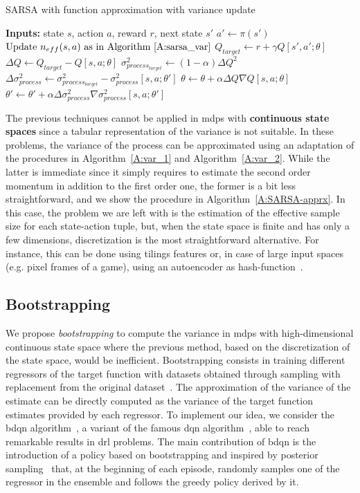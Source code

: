 \begin{algorithm}[t]
\caption{SARSA with function approximation with variance update}
\begin{algorithmic}[1]\label{A:SARSA-apprx}
  \STATE \textbf{Inputs:} state $s$, action $a$, reward $r$, next state $s'$
  \STATE $a' \gets \pi(s')$
  \STATE $\text{Update } n_{eff}(s,a) \text{ as in Algorithm~\ref{A:sarsa_var}}$
  \STATE $Q_{target} \gets r + \gamma Q[s',a'; \theta]$
  \STATE $\Delta Q \gets Q_{target} - Q[s,a; \theta]$
  \STATE $\sigma^2_{process_{target}} \gets (1 - \alpha)\Delta Q^2$
  \STATE $\Delta \sigma^2_{process} \gets \sigma^2_{process_{target}} - \sigma^2_{process}[s,a; \theta']$
  \STATE $\theta \gets \theta + \alpha \Delta Q \nabla Q[s,a; \theta]$
  \STATE $\theta' \gets \theta' + \alpha \Delta \sigma^2_{process} \nabla \sigma^2_{process}[s,a; \theta']$
\end{algorithmic}
\end{algorithm}
The previous techniques cannot be applied in \glspl{mdp} with \textbf{continuous state spaces} since a tabular representation of the variance is not suitable. In these problems, the variance of the process can be approximated using an adaptation of the procedures in Algorithm~\ref{A:var_1} and Algorithm~\ref{A:var_2}. While the latter is immediate since it simply requires to estimate the second order momentum in addition to the first order one, the former is a bit less straightforward, and we show the procedure in Algorithm~\ref{A:SARSA-apprx}. In this case, the problem we are left with is the estimation of the effective sample size for each state-action tuple, but, when the state space is finite and has only a few dimensions, discretization is the most straightforward alternative. For instance, this can be done using tilings features or, in case of large input spaces (e.g. pixel frames of a game), using an autoencoder as hash-function~\cite{tang2017exploration}.

\subsection{Bootstrapping}
We propose \textit{bootstrapping} to compute the variance in \glspl{mdp} with high-dimensional continuous state space where the previous method, based on the discretization of the state space, would be inefficient. Bootstrapping consists in training different regressors of the target function with datasets obtained through sampling with replacement from the original dataset~\cite{doi:10.1162/089976600300015204}. The approximation of the variance of the estimate can be directly computed as the variance of the target function estimates provided by each regressor. To implement our idea, we consider the \gls{bdqn} algorithm~\cite{osband2017deep}, a variant of the famous \gls{dqn} algorithm~\cite{mnih2015human}, able to reach remarkable results in \gls{drl} problems. The main contribution of \gls{bdqn} is the introduction of a policy based on bootstrapping and inspired by posterior sampling~\cite{osband2013more} that, at the beginning of each episode, randomly samples one of the regressor in the ensemble and follows the greedy policy derived by it.

